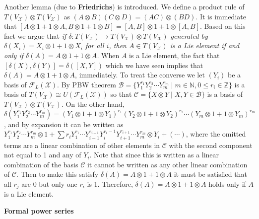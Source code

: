 \documentclass{article}
\newcommand{\NaN}{\mathbb{N}}
\newcommand{\InZ}{\mathbb{Z}}
\newcommand{\SBar}{\;|\;}
\begin{document}
Another lemma (due to \textbf{Friedrichs}) is introduced.
We define a product rule of $T(V_\mathcal{X}) \otimes T(V_\mathcal{X})$ as $(A \otimes B)(C \otimes D) = (AC) \otimes (BD)$.
It is immediate that $[A \otimes 1 + 1 \otimes A, B \otimes 1 + 1 \otimes B] = [A, B] \otimes 1 + 1 \otimes [A, B]$.
Based on this fact we argue that \textit{if $\delta : T(V_\mathcal{X}) \to T(V_\mathcal{X}) \otimes T(V_\mathcal{X})$ generated by $\delta(X_i) = X_i \otimes 1 + 1 \otimes X_i$ for all $i$, then $A \in T(V_\mathcal{X})$ is a Lie element if and only if $\delta(A) = A \otimes 1 + 1 \otimes A$.}
When $A$ is a Lie element, the fact that $[\delta(X), \delta(Y)] = \delta([X, Y])$ which we have seen implies that $\delta(A) = A \otimes 1 + 1 \otimes A$, immediately.
To treat the converse we let $(Y_i)$ be a basis of $\mathcal{F}_L(\mathcal{X})$.
By PBW theorem $\mathcal{B} = \{Y_1^{r_1} Y_2^{r_2} \cdots Y_m^{r_m} \SBar m \in \NaN, 0 \le r_i \in \InZ\}$ is a basis of $T(V_\mathcal{X}) \cong U(\mathcal{F}_L(\mathcal{X}))$ so that $\mathcal{C} = \{X \otimes Y \SBar X, Y \in \mathcal{B}\}$ is a basis of $T(V_\mathcal{X}) \otimes T(V_\mathcal{X})$.
On the other hand, $\delta(Y_1^{r_1} Y_2^{r_2} \cdots Y_m^{r_m}) = (Y_1 \otimes 1 + 1 \otimes Y_1)^{r_1} (Y_2 \otimes 1 + 1 \otimes Y_2)^{r_2} \cdots (Y_m \otimes 1 + 1 \otimes Y_m)^{r_m}$, and by expansion it can be written as $Y_1^{r_1} Y_2^{r_2} \cdots Y_m^{r_m} \otimes 1 + \sum r_i Y_1^{r_1} \cdots Y_{i - 1}^{r_{i - 1}} Y_i^{r_i - 1} Y_{i + 1}^{r_{i + 1}} \cdots Y_m^{r_m} \otimes Y_i + (\cdots)$, where the omitted terms are a linear combination of other elements in $\mathcal{C}$ with the second component not equal to 1 and any of $Y_i$.
Note that since this is written as a linear combination of the basis $\mathcal{C}$ it cannot be written as any other linear combination of $\mathcal{C}$.
Then to make this satisfy $\delta(A) = A \otimes 1 + 1 \otimes A$ it must be satisfied that all $r_j$ are 0 but only one $r_i$ is 1.
Therefore, $\delta(A) = A \otimes 1 + 1 \otimes A$ holds only if $A$ is a Lie element.

\newpage

\textbf{Formal power series}
\end{document}
